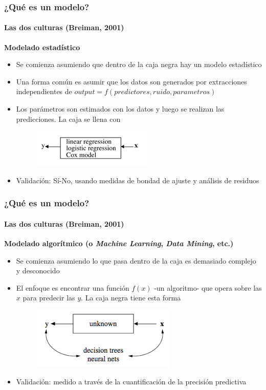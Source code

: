 \documentclass{beamer}
\begin{document}
\begin{frame}
	\frametitle{¿Qué es un modelo?}
	\framesubtitle{Las dos culturas (Breiman, 2001)}
	\textbf{Modelado estadístico}
	\begin{itemize}
		\item{Se comienza asumiendo que dentro de la caja negra hay un modelo estadístico}
		\item{Una forma común es asumir que los datos son generados por extracciones independientes de $output = f(predictores, ruido, parametros)$}
		\item{Los parámetros son estimados con los datos y luego se realizan las predicciones. La caja se llena con}
		\begin{figure}
			\centering
			\includegraphics[width=0.55\linewidth, height=0.18\textheight]{img/two_cult_stat}
		\end{figure}
		\item{Validación: Sí-No, usando medidas de bondad de ajuste y análisis de residuos}		
	\end{itemize}
\end{frame}

\begin{frame}
	\frametitle{¿Qué es un modelo?}
	\framesubtitle{Las dos culturas (Breiman, 2001)}
	\textbf{Modelado algorítmico (o \emph{Machine Learning}, \emph{Data Mining}, etc.)}
	\begin{itemize}
		\item{Se comienza asumiendo lo que pasa dentro de la caja es demasiado complejo y desconocido}
		\item{El enfoque es encontrar una función $f(x)$ -un algoritmo- que opera sobre las $x$ para predecir las $y$. La caja negra tiene esta forma}
		\begin{figure}
			\centering
			\includegraphics[width=0.55\linewidth, height=0.25\textheight]{img/two_cult_algoritmic}
		\end{figure}
		\item{Validación: medido a través de la cuantificación de la precisión predictiva}		
	\end{itemize}
\end{frame}
\end{document}
